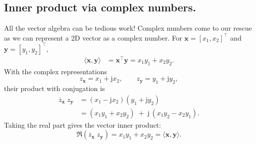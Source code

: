 \subsection{Inner product via complex numbers.}
All the vector algebra can be tedious work! Complex numbers come to our rescue as we can represent a 2D vector as a complex number. For $\mathbf{x}=[x_1,x_2]^{\top}$ and $\mathbf{y}=[y_1,y_2]^{\top}$,
\begin{align*}
\langle \mathbf{x},\mathbf{y}\rangle
&= \mathbf{x}^{\top}\mathbf{y}
= x_1y_1+x_2y_2 .
\end{align*}
With the complex representations
\[
z_{\mathbf{x}}=x_1+\mathrm{j}x_2,\qquad
z_{\mathbf{y}}=y_1+\mathrm{j}y_2,
\]
their product with conjugation is
\begin{align*}
\overline{z}_{\mathbf{x}}\;z_{\mathbf{y}}
&=(x_1-\mathrm{j}x_2)(y_1+\mathrm{j}y_2) \\
&=(x_1y_1+x_2y_2)\;+\;\mathrm{j}\,(x_1y_2 - x_2y_1).
\end{align*}
Taking the real part gives the vector inner product:
\[
\Re\!\left(\overline{z}_{\mathbf{x}}\;z_{\mathbf{y}}\right)=x_1y_1+x_2y_2
=\langle \mathbf{x},\mathbf{y}\rangle .
\]

